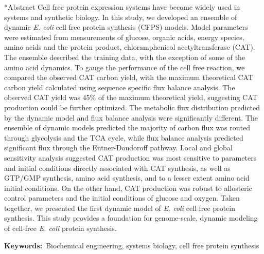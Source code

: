 \documentclass[12pt]{article}
\makeatletter
\renewcommand\section{\@startsection
	{subsection}{2}{0mm}
	{-0.2in}
	{0.05\baselineskip}
	{\normalfont\large\bfseries}}
\makeatother
\begin{document}
\section*{Abstract}
Cell free protein expression systems have become widely used in systems and synthetic biology.
In this study, we developed an ensemble of dynamic \textit{E. coli} cell free protein synthesis (CFPS) models.
Model parameters were estimated from measurements of glucose, organic acids, energy species, amino acids and the protein product, chloramphenicol acetyltransferase (CAT).
The ensemble described the training data, with the exception of some of the amino acid dynamics.
To gauge the performance of the cell free reaction, we compared the observed CAT carbon yield, with the maximum theoretical CAT carbon yield calculated using sequence specific flux
balance analysis. The observed CAT yield was 45\% of the maximum theoretical yield, suggesting CAT production could be further optimized.
The metabolic flux distribution predicted by the dynamic model and flux balance analysis were significantly different.
The ensemble of dynamic models predicted the majority of carbon flux was routed through glycolysis and the TCA cycle,
while flux balance analysis predicted significant flux through the Entner-Doudoroff pathway.
Local and global sensitivity analysis suggested CAT production was most sensitive to parameters and initial conditions directly associated with CAT synthesis, as well as
GTP/GMP synthesis, amino acid synthesis, and to a lesser extent amino acid initial conditions.
On the other hand, CAT production was robust to allosteric control parameters and the initial conditions of glucose and oxygen.
Taken together, we presented the first dynamic model of \textit{E. coli} cell free protein synthesis.
This study provides a foundation for genome-scale, dynamic modeling of cell-free \textit{E. coli} protein synthesis.

\vspace{0.1in}
{\noindent \textbf{Keywords:}~Biochemical engineering, systems biology, cell free protein synthesis}

\pagebreak

\setcounter{page}{1}

\end{document}
